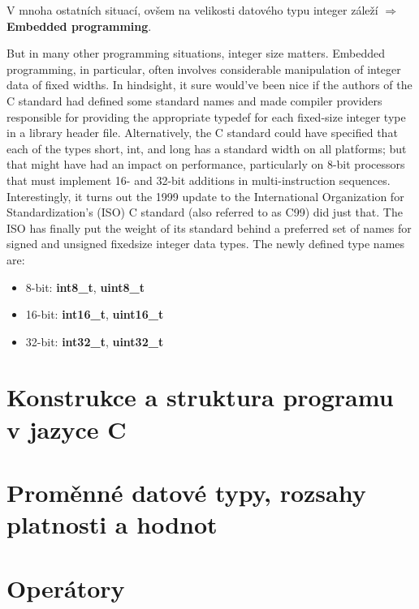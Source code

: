       V mnoha ostatních situací, ovšem na velikosti datového typu integer záleží \(\Rightarrow\) 
      \textbf{Embedded programming}. 
      
      But in many other programming situations, integer size matters. Embedded programming, in 
      particular, often involves considerable manipulation of integer data of fixed widths. 
      In hindsight, it sure would've been nice if the authors of the C standard had defined some 
      standard names and made compiler providers responsible for providing the appropriate typedef 
      for each fixed-size integer type in a library header file. Alternatively, the C standard 
      could have specified that each of the types short, int, and long has a standard width on all 
      platforms; but that might have had an impact on performance, particularly on 8-bit processors 
      that must implement 16- and 32-bit additions in multi-instruction sequences. 
      Interestingly, it turns out the 1999 update to the International Organization for 
      Standardization's (ISO) C standard (also referred to as C99) did just that. The ISO has 
      finally put the weight of its standard behind a preferred set of names for signed and 
      unsigned fixedsize integer data types. The newly defined type names are: 
      \begin{itemize}
        \item  8-bit: \textbf{int8\_t},  \textbf{uint8\_t}
        \item 16-bit: \textbf{int16\_t}, \textbf{uint16\_t}
        \item 32-bit: \textbf{int32\_t}, \textbf{uint32\_t}
      \end{itemize}
      

  \section{Konstrukce a struktura programu v jazyce C}
  \section{Proměnné datové typy, rozsahy platnosti a hodnot}
  \section{Operátory}
